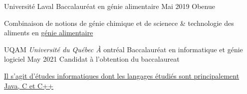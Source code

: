 

\begin{cventries}

  \cventry
    {Université Laval} %
    {Baccalauréat en génie alimentaire} %
    {Mai 2019} %
    {Obenue} %
    {
      \begin{cvitems} %
        \item{Combinaison de notions de génie chimique
            et de scienece \& technologie des aliments en
              \href{https://www.ulaval.ca/les-etudes/programmes/repertoire/details/baccalaureat-en-genie-alimentaire-b-ing.html}
                   {génie alimentaire}}
      \end{cvitems}
    }

  \cventry
    {UQAM \textit{Université du Québec À }ontréal} %
    {Baccalauréat en informatique et génie logiciel} %
    {May 2021} %
    {Candidat à l'obtention du baccalaureat} %
    {
      \begin{cvitems} %
        \item{\href{https://etudier.uqam.ca/programme?code=7416}
             {Il s'agit d'études informatiques dont les langages étudiés
              sont principalement Java, C et C++}}
      \end{cvitems}
    }

\end{cventries}
